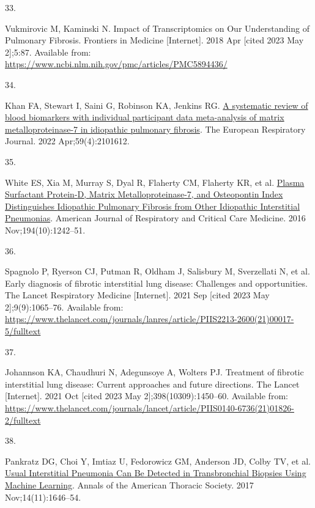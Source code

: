 \documentclass[
]{article}
\newlength{\cslhangindent}
\newlength{\csllabelwidth}
\newlength{\cslentryspacingunit} %
\newenvironment{CSLReferences}[2] %
 {%
  \setlength{\parindent}{0pt}
  \ifodd #1
  \let\oldpar\par
  \def\par{\hangindent=\cslhangindent\oldpar}
  \fi
  \setlength{\parskip}{#2\cslentryspacingunit}
 }%
 {}
\newcommand{\CSLLeftMargin}[1]{\parbox[t]{\csllabelwidth}{#1}}
\newcommand{\CSLRightInline}[1]{\parbox[t]{\linewidth - \csllabelwidth}{#1}\break}
\begin{document}
\begin{CSLReferences}{0}{0}
\leavevmode{}%
\CSLLeftMargin{33. }%
\CSLRightInline{Vukmirovic M, Kaminski N. Impact of {Transcriptomics} on {Our} {Understanding} of {Pulmonary} {Fibrosis}. Frontiers in Medicine {[}Internet{]}. 2018 Apr {[}cited 2023 May 2{]};5:87. Available from: \url{https://www.ncbi.nlm.nih.gov/pmc/articles/PMC5894436/}}

\leavevmode{}%
\CSLLeftMargin{34. }%
\CSLRightInline{Khan FA, Stewart I, Saini G, Robinson KA, Jenkins RG. \href{https://doi.org/10.1183/13993003.01612-2021}{A systematic review of blood biomarkers with individual participant data meta-analysis of matrix metalloproteinase-7 in idiopathic pulmonary fibrosis}. The European Respiratory Journal. 2022 Apr;59(4):2101612. }

\leavevmode{}%
\CSLLeftMargin{35. }%
\CSLRightInline{White ES, Xia M, Murray S, Dyal R, Flaherty CM, Flaherty KR, et al. \href{https://doi.org/10.1164/rccm.201505-0862OC}{Plasma {Surfactant} {Protein}-{D}, {Matrix} {Metalloproteinase}-7, and {Osteopontin} {Index} {Distinguishes} {Idiopathic} {Pulmonary} {Fibrosis} from {Other} {Idiopathic} {Interstitial} {Pneumonias}}. American Journal of Respiratory and Critical Care Medicine. 2016 Nov;194(10):1242--51. }

\leavevmode{}%
\CSLLeftMargin{36. }%
\CSLRightInline{Spagnolo P, Ryerson CJ, Putman R, Oldham J, Salisbury M, Sverzellati N, et al. Early diagnosis of fibrotic interstitial lung disease: Challenges and opportunities. The Lancet Respiratory Medicine {[}Internet{]}. 2021 Sep {[}cited 2023 May 2{]};9(9):1065--76. Available from: \url{https://www.thelancet.com/journals/lanres/article/PIIS2213-2600(21)00017-5/fulltext}}

\leavevmode{}%
\CSLLeftMargin{37. }%
\CSLRightInline{Johannson KA, Chaudhuri N, Adegunsoye A, Wolters PJ. Treatment of fibrotic interstitial lung disease: Current approaches and future directions. The Lancet {[}Internet{]}. 2021 Oct {[}cited 2023 May 2{]};398(10309):1450--60. Available from: \url{https://www.thelancet.com/journals/lancet/article/PIIS0140-6736(21)01826-2/fulltext}}

\leavevmode{}%
\CSLLeftMargin{38. }%
\CSLRightInline{Pankratz DG, Choi Y, Imtiaz U, Fedorowicz GM, Anderson JD, Colby TV, et al. \href{https://doi.org/10.1513/AnnalsATS.201612-947OC}{Usual {Interstitial} {Pneumonia} {Can} {Be} {Detected} in {Transbronchial} {Biopsies} {Using} {Machine} {Learning}}. Annals of the American Thoracic Society. 2017 Nov;14(11):1646--54. }


\end{CSLReferences}
\end{document}
